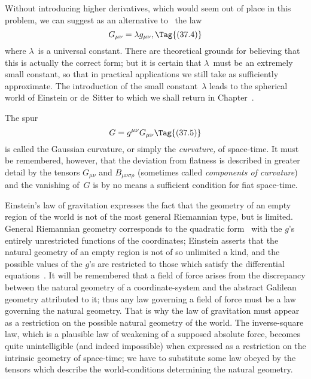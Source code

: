 \documentclass[12pt]{book}
\begin{document}
Without introducing higher derivatives, which would seem out of place in
this problem, we can suggest as an alternative to~ the law
\[
G_{\mu\nu} = \lambda g_{\mu\nu},
\Tag{(37.4)}
\]
where $\lambda$~is a universal constant. There are theoretical grounds for believing
that this is actually the correct form; but it is certain that $\lambda$~must be an
extremely small constant, so that in practical applications we still take 
as sufficiently approximate. The introduction of the small constant~$\lambda$ leads to
the spherical world of Einstein or de~Sitter to which we shall return in
Chapter~\@.

The spur
\[
G = g^{\mu\nu} G_{\mu\nu}
\Tag{(37.5)}
\]
is called the Gaussian curvature, or simply the \emph{curvature,} of space-time. It
%
%
must be remembered, however, that the deviation from flatness is described
in greater detail by the tensors $G_{\mu\nu}$ and $B_{\mu\nu\sigma\rho}$ (sometimes called \emph{components of
curvature}) and the vanishing of~$G$ is by no means a sufficient condition for fiat
space-time.

Einstein's law of gravitation expresses the fact that the geometry of an
empty region of the world is not of the most general Riemannian type, but is
limited. General Riemannian geometry corresponds to the quadratic form~
with the $g$'s entirely unrestricted functions of the coordinates; Einstein
asserts that the natural geometry of an empty region is not of so unlimited a
kind, and the possible values of the $g$'s are restricted to those which satisfy
the differential equations~. It will be remembered that a field of force
arises from the discrepancy between the natural geometry of a coordinate\hyp{}system
and the abstract Galilean geometry attributed to it; thus any law
governing a field of force must be a law governing the natural geometry.
That is why the law of gravitation must appear as a restriction on the possible
natural geometry of the world. The inverse\hyp{}square law, which is a
plausible law of weakening of a supposed absolute force, becomes quite unintelligible
(and indeed impossible) when expressed as a restriction on the
intrinsic geometry of space-time; we have to substitute some law obeyed
by the tensors which describe the world\hyp{}conditions determining the natural
geometry.

%
%
\end{document}

